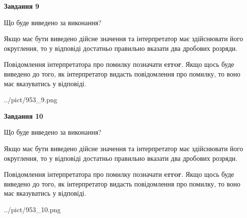 \documentclass[12pt, ukrainian]{article}
\begin{document}
{\begin {Large}
{\begin {center}\textbf{Завдання 9}\end {center}}\par
Що буде виведено за виконання? \par

Якщо має бути виведено дійсне значення та інтерпретатор має здійснювати його округлення, 
то у відповіді достатньо правильно вказати два дробових розряди.

Повідомлення інтерпретатора про помилку позначати \textbf{error}.
Якщо щось буде виведено до того, як інтерпретатор видасть повідомлення про помилку, 
то воно має вказуватись у відповіді. \par

\begin{center}
	{../pict/953_9.png}
\end{center}
\newpage

{\begin {center}\textbf{Завдання 10}\end {center}}\par
Що буде виведено за виконання? \par

Якщо має бути виведено дійсне значення та інтерпретатор має здійснювати його округлення, 
то у відповіді достатньо правильно вказати два дробових розряди.

Повідомлення інтерпретатора про помилку позначати \textbf{error}.
Якщо щось буде виведено до того, як інтерпретатор видасть повідомлення про помилку, 
то воно має вказуватись у відповіді. \par

\begin{center}
	{../pict/953_10.png}
\end{center}
\newpage

\end {Large}}
\end{document}
